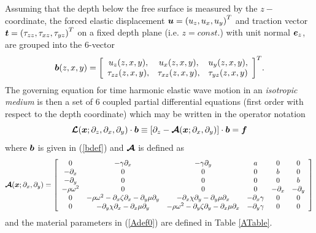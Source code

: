 \documentclass[11pt,a4paper]{article}
\newcommand{\CB}[1]{\mbox{\boldmath$\cal #1$\unboldmath}}
\newcommand{\bmi}[1]{\mbox{\boldmath$\mit #1$\unboldmath}}
\begin{document}
Assuming that the depth below the free surface is measured by the
$z-$coordinate, the forced elastic displacement ${\bmi  u} = {({u}_{z},{u}_{x},{u}_{y})}^{T}$
and traction vector ${\bmi  t} = {({\tau}_{zz},{\tau}_{xz},{\tau}_{yz})}^{T }$ on a
fixed depth plane (i.e. $z=const.$) with unit
normal ${\bmi  e}_{z}$,  are grouped into the $6$-vector
\begin{equation} \label{bdef}
{\bmi  b}(z,x,y)= {\left[ \begin{array}{ccc}{ u}_{ z}
(z,x,y),&{u}_{x}(z,x,y),&{u}_{y}(z,x,y),\\
{\tau}_{zz}(z,x,y),&{\tau}_{xz}(z,x,y),&
{\tau}_{yz}(z,x,y)\end{array} \right]}^{  T }.
\end{equation}
The governing equation for time harmonic elastic wave motion in an {\em isotropic  medium\/}
is then a
set of $6$ coupled partial differential equations (first order with respect
to the depth coordinate) which may be written in the operator notation
\begin{equation} \label{govEqn00}
{\CB L}({\bmi x};{\partial }_{z},{\partial }_{x},{\partial }_{y})\cdot {\bmi  b }\equiv\left[\partial_{z}-{\CB A}({\bmi x};{\partial }_{x},{\partial }_{y})\right]\cdot {\bmi  b }=
{\bmi  f}
\end{equation}
where ${\bmi  b}$ is given in (\ref{bdef})  and
${\CB A}$ is defined as
\begin{equation} \label{Adef0}
{\CB A}({\bmi x};{\partial }_{x},{\partial }_{y})=\left[{\begin{array}{cccccc}
0&- \gamma {\partial }_{  x}&  - \gamma {\partial }_{  y}&  a&0&0\\
-{ \partial }_{x}&0&0&0&b&0\\
-{\partial }_{y}&0&0&0&0&b\\
- \rho {\omega }^{  2}&  0&0&0&-{ \partial }_{x}&-{ \partial }_{y}\\
0&- \rho {\omega }^{  2}  -{\partial }_{x} \zeta {\partial }_{  x}  -{ \partial }_{y} \mu
{\partial }_{  y}&  -{ \partial }_{x} \chi {\partial }_{  y}
 -{ \partial }_{y} \mu {\partial }_{  x}&  -{ \partial }_{x} \gamma &  0&0\\
 0&-{ \partial }_{y} \chi {\partial }_{  x}  -{ \partial }_{x} \mu {\partial }_{  y}&
   - \rho {\omega }^{  2}  -{ \partial }_{y} \zeta {\partial }_{  y}
 -{ \partial }_{x} \mu {\partial }_{  x}&  -{ \partial }_{y} \gamma &  0&0\end{array}}
 \right]
\end{equation}
and the material parameters in (\ref{Adef0}) are defined in Table \ref{ATable}.
\end{document}
